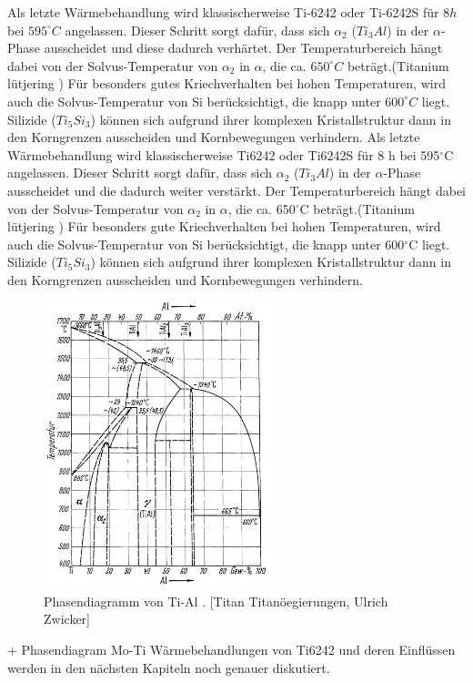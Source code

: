 Als letzte Wärmebehandlung wird klassischerweise  Ti-6242 oder Ti-6242S für  $8 h$ bei $595^\circ C$ angelassen. Dieser Schritt sorgt dafür, dass sich $\alpha_2$ ($Ti_3Al$) in der $\alpha$-Phase ausscheidet und diese dadurch verhärtet. Der Temperaturbereich hängt dabei von der Solvus-Temperatur von $\alpha_2$ in $\alpha$, die ca. $650^\circ C$ beträgt.(Titanium lütjering )
Für besonders gutes Kriechverhalten bei hohen Temperaturen, wird auch die Solvus-Temperatur von Si berücksichtigt, die knapp unter $600^\circ C$ liegt. Silizide ($Ti_5Si_3$) können sich aufgrund ihrer komplexen Kristallstruktur dann in den Korngrenzen ausscheiden und Kornbewegungen verhindern.
Als letzte Wärmebehandlung wird klassischerweise  Ti6242 oder Ti6242S für  8 h bei 595$^\circ$C angelassen. Dieser Schritt sorgt dafür, dass sich $\alpha_2$ ($Ti_3Al$) in der $\alpha$-Phase ausscheidet und die dadurch weiter verstärkt. Der Temperaturbereich hängt dabei von der Solvus-Temperatur von $\alpha_2$ in $\alpha$, die ca. 650$^\circ$C beträgt.(Titanium lütjering )
Für besonders gute Kriechverhalten bei hohen Temperaturen, wird auch die Solvus-Temperatur von Si berücksichtigt, die knapp unter 600$^\circ$C liegt. Silizide ($Ti_5Si_3$) können sich aufgrund ihrer komplexen Kristallstruktur dann in den Korngrenzen ausscheiden und Kornbewegungen verhindern.


\begin{figure}[H]
	\centering
	\includegraphics[width=0.6\textwidth]{Bilder/TiAl}
	\caption{Phasendiagramm von Ti-Al . [Titan Titanöegierungen, Ulrich Zwicker]}
\end{figure}
+ Phasendiagram Mo-Ti
Wärmebehandlungen von Ti6242 und deren Einflüssen werden in den nächsten Kapiteln noch genauer diskutiert.


